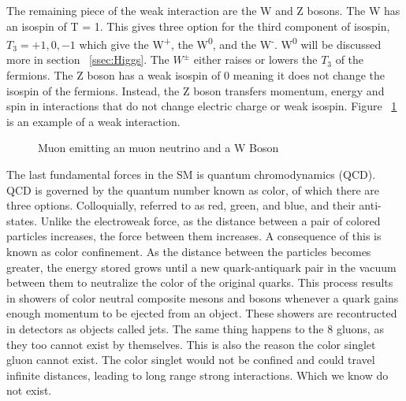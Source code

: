  \indent The remaining piece of the weak interaction are the W and Z bosons. The W has an isospin of T = 1. This gives three option for the third component of isospin, ${T_{3} = +1, 0, -1}$ which give the W\textsuperscript{+}, the W\textsuperscript{0}, and the W\textsuperscript{-}. W\textsuperscript{0} will be discussed more in section ~\ref{ssec:Higgs}. The ${W^{\pm}}$ either raises or lowers the ${T_{3}}$ of the fermions. The Z boson has a weak isospin of 0 meaning it does not change the isospin of the fermions. Instead, the Z boson transfers momentum, energy and spin in interactions that do not change electric charge or weak isospin. Figure ~\ref{Fig:weak_dia} is an example of a weak interaction.\newline

\begin{figure}[h]
\begin{center}

\caption[Muon emitting a neutrino]{Muon emitting an muon neutrino and a W Boson}
\label{Fig:weak_dia}
\end{center}
\end{figure}


The last fundamental forces in the SM is quantum chromodynamics (QCD). QCD is governed by the quantum number known as color, of which there are three options. Colloquially, referred to as red, green, and blue, and their anti-states. Unlike the electroweak force, as the distance between a pair of colored particles increases, the force between them increases. A consequence of this is known as color confinement. As the distance between the particles becomes greater, the energy stored grows until a new quark-antiquark pair in the vacuum between them to neutralize the color of the original quarks. This process results in showers of color neutral composite mesons and bosons whenever a quark gains enough momentum to be ejected from an object. These showers are recontructed in detectors as objects called jets. The same thing happens to the 8 gluons, as they too cannot exist by themselves. This is also the reason the color singlet gluon cannot exist. The color singlet would not be confined and could travel infinite distances, leading to long range strong interactions. Which we know do not exist.
